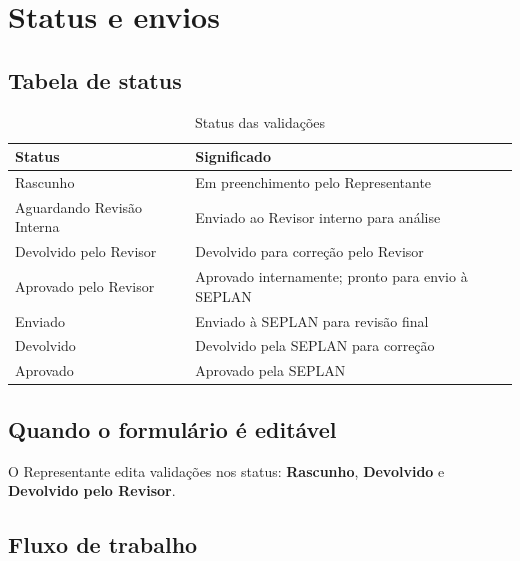 \documentclass[11pt,a4paper]{article}
\begin{document}
\section{Status e envios}

\subsection{Tabela de status}

\begin{table}[htbp]
  \centering
  \guiaTableStretch
  \caption{Status das validações}
  \label{tab:status}
  \begin{tabularx}{\textwidth}{@{}L{4.8cm} Y@{}}
    \toprule
    \textbf{Status} & \textbf{Significado} \\
    \midrule
    Rascunho & Em preenchimento pelo Representante \\
    Aguardando Revisão Interna & Enviado ao Revisor interno para análise \\
    Devolvido pelo Revisor & Devolvido para correção pelo Revisor \\
    Aprovado pelo Revisor & Aprovado internamente; pronto para envio à SEPLAN \\
    Enviado & Enviado à SEPLAN para revisão final \\
    Devolvido & Devolvido pela SEPLAN para correção \\
    Aprovado & Aprovado pela SEPLAN \\
    \bottomrule
  \end{tabularx}
\end{table}

\subsection{Quando o formulário é editável}

O Representante edita validações nos status: \textbf{Rascunho}, \textbf{Devolvido} e \textbf{Devolvido pelo Revisor}.

\subsection{Fluxo de trabalho}
\end{document}
